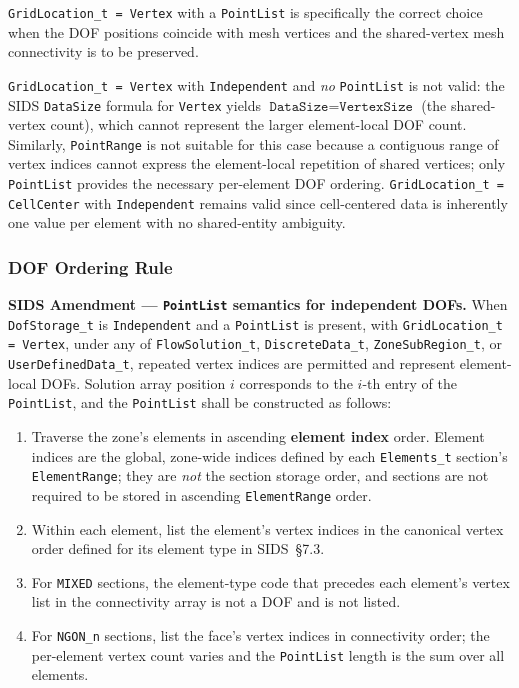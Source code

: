 \documentclass[11pt,letterpaper]{article}
\begin{document}
\texttt{GridLocation\_t = Vertex} with a \texttt{PointList} is
specifically the correct choice when the DOF positions coincide with
mesh vertices and the shared-vertex mesh connectivity is to be
preserved.

\texttt{GridLocation\_t = Vertex} with \texttt{Independent}
and \emph{no} \texttt{PointList} is not valid: the SIDS
\texttt{DataSize} formula for \texttt{Vertex} yields
$\texttt{DataSize} = \texttt{VertexSize}$ (the shared-vertex count),
which cannot represent the larger element-local DOF count.
Similarly, \texttt{PointRange} is not suitable for this case because
a contiguous range of vertex indices cannot express the element-local
repetition of shared vertices; only \texttt{PointList} provides the
necessary per-element DOF ordering.
\texttt{GridLocation\_t = CellCenter} with \texttt{Independent}
remains valid since cell-centered data is inherently one value per
element with no shared-entity ambiguity.

\subsubsection{DOF Ordering Rule}
\label{sec:ordering-rule}

\textbf{SIDS Amendment ---
\texttt{PointList} semantics for independent DOFs.}
When \texttt{DofStorage\_t} is \texttt{Independent} and a
\texttt{PointList} is present, with
\texttt{GridLocation\_t = Vertex}, under any of
\texttt{FlowSolution\_t}, \texttt{DiscreteData\_t},
\texttt{ZoneSubRegion\_t}, or \texttt{UserDefinedData\_t},
repeated vertex indices are
permitted and represent element-local DOFs.  Solution array position
$i$ corresponds to the $i$-th entry of the \texttt{PointList}, and the
\texttt{PointList} shall be constructed as follows:

\begin{enumerate}[leftmargin=2em]
\item Traverse the zone's elements in ascending \textbf{element index}
  order.  Element indices are the global, zone-wide indices defined by
  each \texttt{Elements\_t} section's \texttt{ElementRange}; they are
  \emph{not} the section storage order, and sections are not required
  to be stored in ascending \texttt{ElementRange} order.

\item Within each element, list the element's vertex indices in the
  canonical vertex order defined for its element type in
  SIDS~\S7.3.

\item For \texttt{MIXED} sections, the element-type code that precedes
  each element's vertex list in the connectivity array is not a DOF and
  is not listed.

\item For \texttt{NGON\_n} sections, list the face's vertex indices in
  connectivity order; the per-element vertex count varies and the
  \texttt{PointList} length is the sum over all elements.
\end{enumerate}
\end{document}
